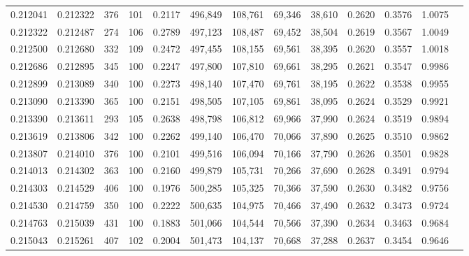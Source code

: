 \begin{tabular}{rrrrrrrrrrrrr}
0.212041 & 0.212322 &   376 & 101 &                                     0.2117 & 496,849 & 108,761 &  69,346 &  38,610 & 0.2620 & 0.3576 & 1.0075 \\
0.212322 & 0.212487 &   274 & 106 &                                     0.2789 & 497,123 & 108,487 &  69,452 &  38,504 & 0.2619 & 0.3567 & 1.0049 \\
0.212500 & 0.212680 &   332 & 109 &                                     0.2472 & 497,455 & 108,155 &  69,561 &  38,395 & 0.2620 & 0.3557 & 1.0018 \\
0.212686 & 0.212895 &   345 & 100 &                                     0.2247 & 497,800 & 107,810 &  69,661 &  38,295 & 0.2621 & 0.3547 & 0.9986 \\
0.212899 & 0.213089 &   340 & 100 &                                     0.2273 & 498,140 & 107,470 &  69,761 &  38,195 & 0.2622 & 0.3538 & 0.9955 \\
0.213090 & 0.213390 &   365 & 100 &                                     0.2151 & 498,505 & 107,105 &  69,861 &  38,095 & 0.2624 & 0.3529 & 0.9921 \\
0.213390 & 0.213611 &   293 & 105 &                                     0.2638 & 498,798 & 106,812 &  69,966 &  37,990 & 0.2624 & 0.3519 & 0.9894 \\
0.213619 & 0.213806 &   342 & 100 &                                     0.2262 & 499,140 & 106,470 &  70,066 &  37,890 & 0.2625 & 0.3510 & 0.9862 \\
0.213807 & 0.214010 &   376 & 100 &                                     0.2101 & 499,516 & 106,094 &  70,166 &  37,790 & 0.2626 & 0.3501 & 0.9828 \\
0.214013 & 0.214302 &   363 & 100 &                                     0.2160 & 499,879 & 105,731 &  70,266 &  37,690 & 0.2628 & 0.3491 & 0.9794 \\
0.214303 & 0.214529 &   406 & 100 &                                     0.1976 & 500,285 & 105,325 &  70,366 &  37,590 & 0.2630 & 0.3482 & 0.9756 \\
0.214530 & 0.214759 &   350 & 100 &                                     0.2222 & 500,635 & 104,975 &  70,466 &  37,490 & 0.2632 & 0.3473 & 0.9724 \\
0.214763 & 0.215039 &   431 & 100 &                                     0.1883 & 501,066 & 104,544 &  70,566 &  37,390 & 0.2634 & 0.3463 & 0.9684 \\
0.215043 & 0.215261 &   407 & 102 &                                     0.2004 & 501,473 & 104,137 &  70,668 &  37,288 & 0.2637 & 0.3454 & 0.9646 \\

\end{tabular}

